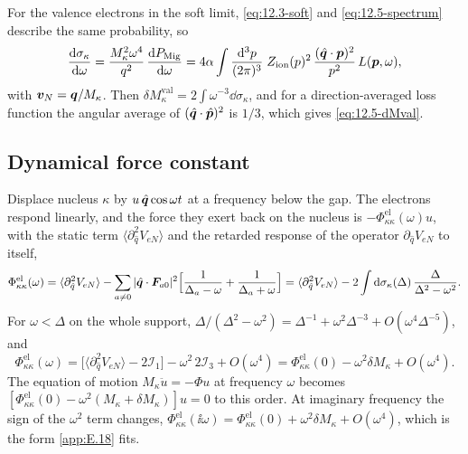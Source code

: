 For the valence electrons in the soft limit, \cref{eq:12.3-soft} and \cref{eq:12.5-spectrum} describe the same probability, so
\begin{equation*}
  \frac{\mathrm{d}\sigma_\kappa}{\mathrm{d}\omega} = \frac{M_\kappa^2\omega^4}{q^2}\,\frac{\mathrm{d} P_{\mathrm{Mig}}}{\mathrm{d}\omega}
  = 4\alpha\int\frac{\mathrm{d}^3p}{(2\pi)^3}\;Z_{\mathrm{ion}}(p)^2\,\frac{(\hat{\bm{q}}\cdot\bm{p})^2}{p^2}\,L(\bm{p},\omega) ,
\end{equation*}
with $\bm{v}_N = \bm{q}/M_\kappa$. Then $\delta M^{\mathrm{val}}_\kappa = 2\int\omega^{-3}\dd\sigma_\kappa$, and for a direction-averaged loss function the angular average of $(\hat{\bm{q}}\cdot\hat{\bm{p}})^2$ is $1/3$, which gives \cref{eq:12.5-dMval}.

\subsection{Dynamical force constant}\label{app:D.34-dynamic}

Displace nucleus $\kappa$ by $u\,\hat{\bm{q}}\cos\omega t$ at a frequency below the gap. The electrons respond linearly, and the force they exert back on the nucleus is $-\Phi^{\mathrm{el}}_{\kappa\kappa}(\omega)u$, with the static term $\langle\partial^2_{\hat q}V_{eN}\rangle$ and the retarded response of the operator $\partial_{\hat q}V_{eN}$ to itself,
\begin{equation*}
  \Phi^{\mathrm{el}}_{\kappa\kappa}(\omega) = \langle\partial^2_{\hat q}V_{eN}\rangle - \sum_{a\neq0}|\hat{\bm{q}}\cdot\bm{F}_{a0}|^2\Bigl[\frac{1}{\Delta_a - \omega} + \frac{1}{\Delta_a + \omega}\Bigr]
  = \langle\partial^2_{\hat q}V_{eN}\rangle - 2\int\mathrm{d}\sigma_\kappa(\Delta)\,\frac{\Delta}{\Delta^2 - \omega^2} .
\end{equation*}
For $\omega < \Delta$ on the whole support, $\Delta/(\Delta^2 - \omega^2) = \Delta^{-1} + \omega^2\Delta^{-3} + O(\omega^4\Delta^{-5})$, and
\begin{equation*}
  \Phi^{\mathrm{el}}_{\kappa\kappa}(\omega) = \bigl[\langle\partial^2_{\hat q}V_{eN}\rangle - 2\mathcal{I}_1\bigr] - \omega^2\,2\mathcal{I}_3 + O(\omega^4) = \Phi^{\mathrm{el}}_{\kappa\kappa}(0) - \omega^2\delta M_\kappa + O(\omega^4) .
\end{equation*}
The equation of motion $M_\kappa\ddot u = -\Phi u$ at frequency $\omega$ becomes $[\Phi^{\mathrm{el}}_{\kappa\kappa}(0) - \omega^2(M_\kappa + \delta M_\kappa)]u = 0$ to this order. At imaginary frequency the sign of the $\omega^2$ term changes, $\Phi^{\mathrm{el}}_{\kappa\kappa}(\ii\omega) = \Phi^{\mathrm{el}}_{\kappa\kappa}(0) + \omega^2\delta M_\kappa + O(\omega^4)$, which is the form \cref{app:E.18} fits.

